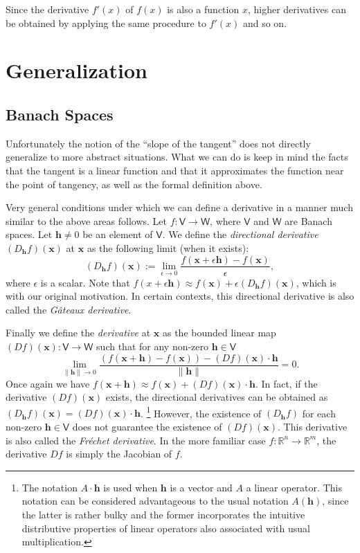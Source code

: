 \documentclass[12pt]{article}
\def\R{{\mathbb R}}
\def\V{{\mathsf V}}
\def\W{{\mathsf W}}
\def\x{{\mathbf x}}
\def\h{{\mathbf h}}
\def\eps{\epsilon}
\begin{document}
	Since the derivative $f'(x)$ of $f(x)$ is also a function $x$,
	higher derivatives can be obtained by applying the same procedure
	to $f'(x)$ and so on.

\section*{Generalization}
\subsection*{Banach Spaces}
	Unfortunately the notion of the ``slope of the tangent'' does not
	directly generalize to more abstract situations. What we can do is
	keep in mind the facts that the tangent is a linear function and that
	it approximates the function near the point of tangency, as well as
	the formal definition above.

	Very general conditions under which we can define a derivative in
	a manner much similar to the above areas follows.
	Let $f\colon\V\to\W$, where $\V$ and $\W$ are Banach
	spaces. Let $\h\ne 0$ be an element of $\V$. We define the
	\emph{directional derivative} $(D_\h f)(\x)$ at $\x$ as the following
	limit (when it exists):
	\[
		(D_\h f)(\x) := \lim_{\eps\to0} \frac{f(\x+\eps\h)-f(\x)}{\eps},
	\]
	where $\eps$ is a scalar. Note that $f(x+\eps\h)\approx f(\x) +
	\eps(D_\h f)(\x)$, which is  with
	our original motivation. In certain contexts, this directional derivative is also called the \emph{G\^ateaux derivative}.

	Finally we define the {\em derivative} at
	$\x$ as the bounded linear map $(Df)(\x)\colon\V\to\W$ such that for any
	non-zero $\h\in\V$
	\[
		\lim_{\|\h\|\to0} \frac{(f(\x+\h)-f(\x))-(Df)(\x)\cdot\h}{\|\h\|}=0.
	\]
	Once again we have $f(\x+\h)\approx f(\x)+(Df)(\x)\cdot\h$. In fact,
	if the derivative $(Df)(\x)$ exists, the directional derivatives can
	be obtained as $(D_\h f)(\x) = (Df)(\x)\cdot\h$.%
		\footnote{The notation $A\cdot\h$ is used when $\h$ is a
		vector and $A$ a linear operator. This notation can be
		considered advantageous to the usual notation $A(\h)$, since
		the latter is rather bulky and the former incorporates the
		intuitive distributive properties of linear operators also
		associated with usual multiplication.} %
	However, the
	existence of $(D_\h f)$ for each non-zero $\h\in\V$ does not guarantee
	the existence of $(Df)(\x)$. This derivative is also called the
	\emph{Fr\'echet derivative}. In the more familiar case
	$f\colon\R^n\to\R^m$, the derivative $Df$ is simply the Jacobian of
	$f$.
\end{document}
